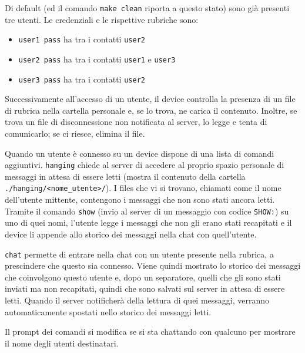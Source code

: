 \documentclass[11pt,a4paper,twocolumn,twoside]{paper}
\begin{document}
    Di default (ed il comando \texttt{make\ clean} riporta a questo
    stato) sono già presenti tre utenti. Le credenziali e le rispettive
    rubriche sono:
    \begin{itemize}[leftmargin=4mm, noitemsep]
      \item\texttt{user1\ pass} ha tra i contatti \texttt{user2}
      \item\texttt{user2\ pass} ha tra i contatti \texttt{user1} e \texttt{user3}
      \item\texttt{user3\ pass} ha tra i contatti \texttt{user2}
    \end{itemize}
    Successivamente all'accesso di un utente, il device controlla la
    presenza di un file di rubrica nella cartella personale e, se lo
    trova, ne carica il contenuto. Inoltre, se trova un file di
    disconnessione non notificata al server, lo legge e tenta di
    comunicarlo; se ci riesce, elimina il file.

    Quando un utente è connesso su un device dispone di una lista di
    comandi aggiuntivi. \texttt{hanging} chiede al server di accedere al
    proprio spazio personale di messaggi in attesa di essere letti
    (mostra il contenuto della cartella
    \texttt{./hanging/\textless{}nome\_utente\textgreater{}/}). I files
    che vi si trovano, chiamati come il nome dell'utente mittente,
    contengono i messaggi che non sono stati ancora letti. Tramite il
    comando \texttt{show} (invio al server di un messaggio con codice
    \texttt{SHOW:}) su uno di quei nomi, l'utente legge i messaggi che
    non gli erano stati recapitati e il device li appende allo storico
    dei messaggi nella chat con quell'utente.

    \texttt{chat} permette di entrare nella chat con un utente presente
    nella rubrica, a prescindere che questo sia connesso. Viene quindi
    mostrato lo storico dei messaggi che coinvolgono questo utente e,
    dopo un separatore, quelli che gli sono stati inviati ma non
    recapitati, quindi che sono salvati sul server in attesa di essere
    letti. Quando il server notificherà della lettura di quei messaggi,
    verranno automaticamente spostati nello storico dei messaggi letti.

    Il prompt dei comandi si modifica se si sta chattando con qualcuno
    per mostrare il nome degli utenti destinatari.
\end{document}
